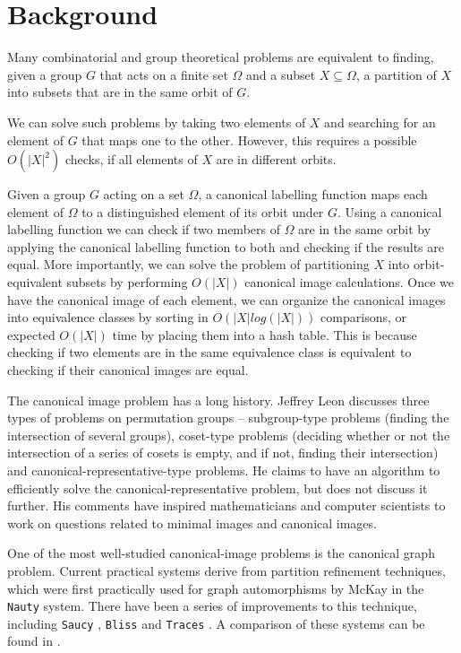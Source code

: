 
\section{Background}

Many combinatorial and group theoretical problems
\cite{DBLP:journals/combinatorics/Soicher99,gent2000symmetry,Distler2012} are
equivalent to finding, given a group \(G\) that acts on a finite set \(\Omega\)
and a subset \(X \subseteq \Omega\), a partition of \(X\) into subsets that are
in the same orbit of \(G\).

We can solve such problems by taking two elements of \(X\) and searching for an element of
\(G\) that maps one to the other. However, this  requires a possible \(O(|X|^2)\) checks,
if all elements of \(X\) are in different orbits.

Given a group \(G\) acting on a set \(\Omega\), a canonical labelling function
 maps each element of \(\Omega\)
to a distinguished element of its orbit under \(G\). Using a canonical labelling function we can check if
two members of \(\Omega\) are in the same orbit by applying the canonical labelling function to both
and checking if the results are equal. More importantly, we can
solve the problem of partitioning \(X\) into orbit-equivalent subsets by performing \(O(|X|)\)
canonical image calculations. Once we have the canonical image of each element, we can organize
the canonical images into equivalence classes by sorting in \(O(|X|log(|X|))\) comparisons, or expected \(O(|X|)\)
time by placing them into a hash table. This is because checking
if two elements are in the same equivalence class is equivalent to checking if their canonical images
are equal.

The canonical image problem has a long history.
Jeffrey Leon \cite{Leon} discusses three types of problems on permutation groups
-- subgroup-type problems (finding the intersection of several
groups), coset-type problems (deciding whether or not the intersection of a
series of cosets is empty, and if not, finding their intersection) and
canonical-representative-type problems. He claims to have an algorithm to efficiently
solve the canonical-representative problem, but does not discuss it further. His comments
have inspired mathematicians and computer scientists
to work on questions related to minimal images and canonical images.

One of the most well-studied canonical-image problems is the canonical graph
problem. Current practical systems derive from partition refinement
techniques, which were first practically used for graph automorphisms by McKay
\cite{McKay80} in the \texttt{Nauty} system. There have been a series of
improvements to this technique, including \texttt{Saucy} \cite{Saucy},
\texttt{Bliss} \cite{JunttilaKaski:ALENEX2007} and \texttt{Traces} \cite{McKay201494}.
A comparison of these systems can be found in \cite{McKay201494}.

